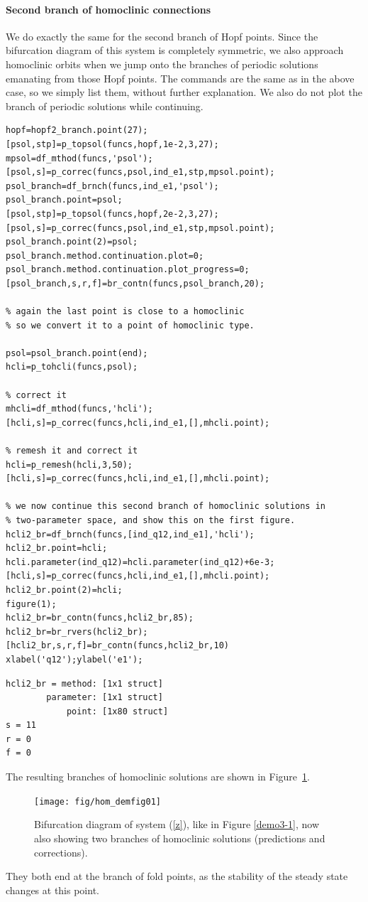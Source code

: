 \documentclass[10pt]{scrartcl}
\begin{document}
{\paragraph{Second branch of homoclinic connections}
We do exactly the same for the second branch of Hopf points.  Since
the bifurcation diagram of this system is completely symmetric, we
also approach homoclinic orbits when we jump onto the branches of
periodic solutions emanating from those Hopf points.  The commands are
the same as in the above case, so we simply list them, without further
explanation.  We also do not plot the branch of periodic solutions
while continuing.  
\begin{lstlisting}
hopf=hopf2_branch.point(27);
[psol,stp]=p_topsol(funcs,hopf,1e-2,3,27);
mpsol=df_mthod(funcs,'psol');
[psol,s]=p_correc(funcs,psol,ind_e1,stp,mpsol.point);
psol_branch=df_brnch(funcs,ind_e1,'psol');
psol_branch.point=psol;
[psol,stp]=p_topsol(funcs,hopf,2e-2,3,27);
[psol,s]=p_correc(funcs,psol,ind_e1,stp,mpsol.point);
psol_branch.point(2)=psol;
psol_branch.method.continuation.plot=0;
psol_branch.method.continuation.plot_progress=0;
[psol_branch,s,r,f]=br_contn(funcs,psol_branch,20);

% again the last point is close to a homoclinic
% so we convert it to a point of homoclinic type.

psol=psol_branch.point(end);
hcli=p_tohcli(funcs,psol);

% correct it
mhcli=df_mthod(funcs,'hcli');
[hcli,s]=p_correc(funcs,hcli,ind_e1,[],mhcli.point);

% remesh it and correct it
hcli=p_remesh(hcli,3,50);
[hcli,s]=p_correc(funcs,hcli,ind_e1,[],mhcli.point);

% we now continue this second branch of homoclinic solutions in
% two-parameter space, and show this on the first figure.
hcli2_br=df_brnch(funcs,[ind_q12,ind_e1],'hcli');
hcli2_br.point=hcli;
hcli.parameter(ind_q12)=hcli.parameter(ind_q12)+6e-3;
[hcli,s]=p_correc(funcs,hcli,ind_e1,[],mhcli.point);
hcli2_br.point(2)=hcli;
figure(1);
hcli2_br=br_contn(funcs,hcli2_br,85);
hcli2_br=br_rvers(hcli2_br);
[hcli2_br,s,r,f]=br_contn(funcs,hcli2_br,10)
xlabel('q12');ylabel('e1');  
\end{lstlisting}
{\small
\begin{verbatim}
hcli2_br = method: [1x1 struct]
        parameter: [1x1 struct]
            point: [1x80 struct]
s = 11
r = 0
f = 0
\end{verbatim}
}
The resulting branches of homoclinic solutions are shown in
Figure~\ref{demo3-1b}.
\begin{figure}[ht]
\begin{center}
\texttt{[image: fig/hom\_demfig01]}
\caption{\label{demo3-1b}Bifurcation diagram of system (\ref{z}), like 
in Figure \ref{demo3-1}, now also showing two branches of homoclinic 
solutions (predictions and corrections).}
\end{center}
\end{figure}
They both end at the branch of fold points, as the stability of the 
steady state
changes at this point.  

}
\end{document}
